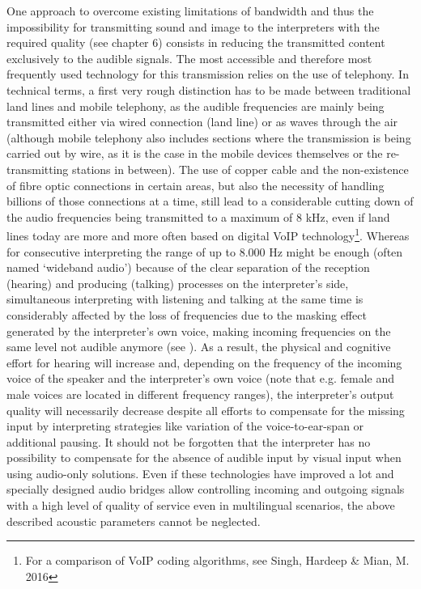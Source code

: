 \documentclass[output=paper]{langsci/langscibook}
\begin{document}
One approach to overcome existing limitations of bandwidth and thus the impossibility for transmitting sound and image to the interpreters with the required quality (see chapter 6) consists in reducing the transmitted content exclusively to the audible signals. The most accessible and therefore most frequently used technology for this transmission relies on the use of telephony. In technical terms, a first very rough distinction has to be made between traditional land lines and mobile telephony, as the audible frequencies are mainly being transmitted either via wired connection (land line) or as waves through the air (although mobile telephony also includes sections where the transmission is being carried out by wire, as it is the case in the mobile devices themselves or the re-transmitting stations in between). The use of copper cable and the non-existence of fibre optic connections in certain areas, but also the necessity of handling billions of those connections at a time, still lead to a considerable cutting down of the audio frequencies being transmitted to a maximum of 8 kHz, even if land lines today are more and more often based on digital VoIP technology\footnote{For a comparison of VoIP coding algorithms, see Singh, Hardeep \& Mian, M. 2016}. Whereas for consecutive interpreting the range of up to 8.000 Hz might be enough (often named ‘wideband audio’) because of the clear separation of the reception (hearing) and producing (talking) processes on the interpreter’s side, simultaneous interpreting with listening and talking at the same time is considerably affected by the loss of frequencies due to the masking effect generated by the interpreter’s own voice, making incoming frequencies on the same level not audible anymore (see \citealt{Jumpelt1984}). As a result, the physical and cognitive effort for hearing will increase and, depending on the frequency of the incoming voice of the speaker and the interpreter’s own voice (note that e.g. female and male voices are located in different frequency ranges), the interpreter’s output quality will necessarily decrease despite all efforts to compensate for the missing input by interpreting strategies like variation of the voice-to-ear-span or additional pausing. It should not be forgotten that the interpreter has no possibility to compensate for the absence of audible input by visual input when using audio-only solutions. Even if these technologies have improved a lot and specially designed audio bridges allow controlling incoming and outgoing signals with a high level of quality of service even in multilingual scenarios, the above described acoustic parameters cannot be neglected.
\end{document}
